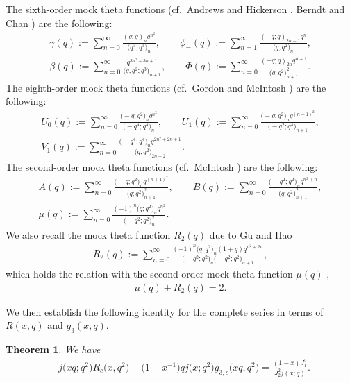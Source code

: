 \documentclass[10pt,a4paper]{amsart}
\numberwithin{equation}{section}
\newtheorem{Theorem}{Theorem}[section]
\begin{document}
The sixth-order mock theta functions (cf.\ Andrews and Hickerson \cite{AH}, Berndt and Chan \cite{BC}) are the following:
\begin{gather*}
\gamma(q):=\sum_{n=0}^{\infty}\frac{(q;q)_nq^{n^2}}{\bigl(q^3;q^3\bigr)_n},\qquad
\phi_-(q):=\sum_{n=1}^{\infty}\frac{(-q;q)_{2n-1}q^n}{\bigl(q;q^2\bigr)_n},\\
\beta(q):=\sum_{n=0}^{\infty}\frac{q^{3n^2+3n+1}}{\bigl(q,q^2;q^3\bigr)_{n+1}},\qquad
\varPhi(q):=\sum_{n=0}^{\infty}\frac{(-q;q)_{2n}q^{n+1}}{\bigl(q;q^2\bigr)_{n+1}^2}.
\end{gather*}
The eighth-order mock theta functions (cf.\ Gordon and McIntosh \cite{GM2})  are the following:
\begin{gather*}
U_0(q):=\sum_{n=0}^{\infty}\frac{\bigl(-q;q^2\bigr)_nq^{n^2}}{\bigl(-q^4;q^4\bigr)_n},\qquad
U_1(q):=\sum_{n=0}^{\infty}\frac{\bigl(-q;q^2\bigr)_nq^{(n+1)^2}}
{\bigl(-q^2;q^4\bigr)_{n+1}},\\
V_1(q):=\sum_{n=0}^{\infty}\frac{\bigl(-q^4;q^4\bigr)_n q^{2n^2+2n+1}}{\bigl(q;q^2\bigr)_{2n+2}}.
\end{gather*}
The second-order mock theta functions (cf.\ McIntosh \cite{McI}) are the following:
\begin{gather*}
A(q):=\sum_{n=0}^{\infty}\frac{\bigl(-q;q^2\bigr)_n q^{(n+1)^2}}{\bigl(q;q^2\bigr)_{n+1}^2},\qquad
B(q):=\sum_{n=0}^{\infty}\frac{\bigl(-q^2;q^2\bigr)_n q^{n^2+n}}{\bigl(q;q^2\bigr)_{n+1}^2},\\
\mu(q):=\sum_{n=0}^{\infty}\frac{(-1)^n\bigl(q;q^2\bigr)_nq^{n^2}}{\bigl(-q^2;q^2\bigr)_n^2}.
\end{gather*}
We also recall the mock theta function $R_2(q)$ due to Gu and Hao \cite{GH}
\begin{align*}
R_2(q):=\sum_{n=0}^{\infty}\frac{(-1)^n\bigl(q;q^2\bigr)_n(1+q)q^{n^2+2n}}
{\bigl(-q^2;q^2\bigr)_n\bigl(-q^2;q^2\bigr)_{n+1}},
\end{align*}
which holds the relation with the second-order mock theta function $\mu(q)$ \cite[equation~(1.7)]{GH},
\begin{align*}
\mu(q)+R_2(q)=2.
\end{align*}

We then establish the following identity for the complete series in terms of $R(x,q)$ and $g_3(x,q)$.

\begin{Theorem}\label{3+2}
We have
\begin{align}\label{1+2}
&j\bigl(xq;q^2\bigr)R_c\bigl(x,q^2\bigr)-\bigl(1-x^{-1}\bigr)qj\bigl(x;q^2\bigr)g_{3,c}\bigl(xq,q^2\bigr)
=\frac{(1-x)J_1^5}{J_2^2j(x;q)}.
\end{align}
\end{Theorem}
\end{document}
